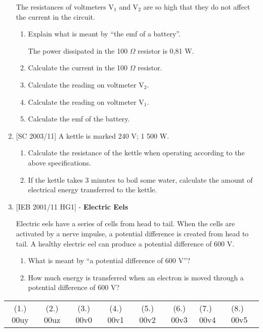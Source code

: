 \begin{eocexercises}{}
\begin{enumerate}
{The resistances of voltmeters V$_1$ and V$_2$ are so high that they do not affect the current in the circuit.

\begin{enumerate}
\item{Explain what is meant by ``the emf of a battery''.}

The power dissipated in the 100 $\Omega$ resistor is 0,81 W.
\item{Calculate the current in the 100 $\Omega$ resistor.}
\item{Calculate the reading on voltmeter V$_2$.}
\item{Calculate the reading on voltmeter V$_1$.}
\item{Calculate the emf of the battery.}
\end{enumerate}}

\item{[SC 2003/11] A kettle is marked 240 V; 1 500 W.
\begin{enumerate}
\item{Calculate the resistance of the kettle when operating according to the above specifications.}
\item{If the kettle takes 3 minutes to boil some water, calculate the amount of electrical energy transferred to the kettle.}
\end{enumerate}}

\item{[IEB 2001/11 HG1] - \textbf{Electric Eels}

Electric eels have a series of cells from head to tail. When the cells are activated by a nerve impulse, a potential difference is created from head to tail. A healthy electric eel can produce a potential difference of 600 V.
\begin{enumerate}
\item{What is meant by ``a potential difference of 600 V''?}
\item{How much energy is transferred when an electron is moved through a potential difference of 600 V?}
\end{enumerate}}

\end{enumerate}
\practiceinfo

\begin{tabular}[h]{cccccc}
(1.) 00uy & (2.) 00uz & (3.) 00v0 & (4.) 00v1 & (5.) 00v2 & (6.) 00v3 & (7.) 00v4 & (8.) 00v5 & 
 \end{tabular}
\end{eocexercises}





